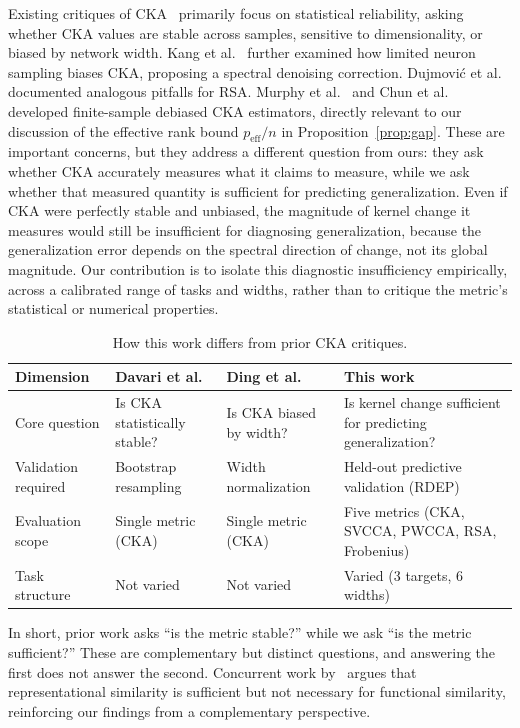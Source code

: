 \documentclass[10pt]{article}
\begin{document}
Existing critiques of CKA~\citep{davari2022reliability,ding2021grounding} primarily focus on statistical reliability, asking whether CKA values are stable across samples, sensitive to dimensionality, or biased by network width.  Kang et al.~\cite{kang2025spectral} further examined how limited neuron sampling biases CKA, proposing a spectral denoising correction.  Dujmović et al.~\cite{dujmovic2025pitfalls} documented analogous pitfalls for RSA.  Murphy et al.~\cite{murphy2024cka} and Chun et al.~\cite{chun2025debias} developed finite-sample debiased CKA estimators, directly relevant to our discussion of the effective rank bound $p_{\text{eff}} / n$ in Proposition~\ref{prop:gap}.  These are important concerns, but they address a different question from ours: they ask whether CKA accurately measures what it claims to measure, while we ask whether that measured quantity is sufficient for predicting generalization.  Even if CKA were perfectly stable and unbiased, the magnitude of kernel change it measures would still be insufficient for diagnosing generalization, because the generalization error depends on the spectral direction of change, not its global magnitude.  Our contribution is to isolate this diagnostic insufficiency empirically, across a calibrated range of tasks and widths, rather than to critique the metric's statistical or numerical properties.

\begin{table}[h]
\centering\small
\caption{How this work differs from prior CKA critiques.}
\label{tab:related_diff}
\begin{tabular}{p{3cm}p{3.2cm}p{3.2cm}p{3.2cm}}
\toprule
Dimension & Davari et al.~\cite{davari2022reliability} & Ding et al.~\cite{ding2021grounding} & This work \\
\midrule
Core question & Is CKA statistically stable? & Is CKA biased by width? & Is kernel change sufficient for predicting generalization? \\
Validation required & Bootstrap resampling & Width normalization & Held-out predictive validation (RDEP) \\
Evaluation scope & Single metric (CKA) & Single metric (CKA) & Five metrics (CKA, SVCCA, PWCCA, RSA, Frobenius) \\
Task structure & Not varied & Not varied & Varied (3 targets, 6 widths) \\
\bottomrule
\end{tabular}
\end{table}

In short, prior work asks ``is the metric stable?'' while we ask ``is the metric sufficient?'' These are complementary but distinct questions, and answering the first does not answer the second.  Concurrent work by~\citet{bridging2026usable} argues that representational similarity is sufficient but not necessary for functional similarity, reinforcing our findings from a complementary perspective.
\end{document}
